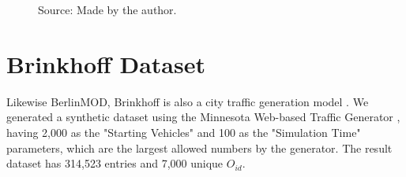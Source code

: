 {\begin{figure}[h!]
\begin{subfigure}[t]{0.48\textwidth}
        \label{fig:tdrive_disks}
    \end{subfigure}
    \footnotesize{Source: Made by the author.}
    \label{fig:tdrive_results2}
\end{figure}

\section{Brinkhoff Dataset}
\label{sec:brinkhoff}
Likewise BerlinMOD, Brinkhoff is also a city traffic generation model \citep{brinkhoffpaper}. We generated a synthetic
dataset using the Minnesota Web-based Traffic Generator \citep{mntg}, having 2,000 as the "Starting Vehicles" and 100 as
the "Simulation Time" parameters, which are the largest allowed numbers by the generator. The result dataset has 314,523
entries and 7,000 unique $O_{id}$.

}
